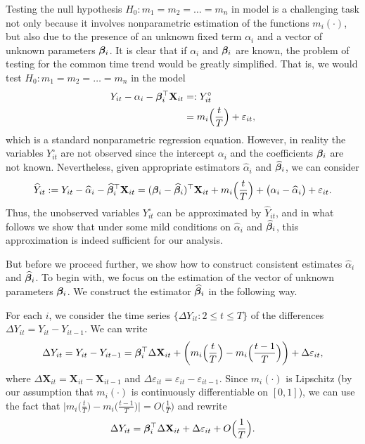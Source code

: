 \documentclass[a4paper,12pt]{article}
\makeatletter
\renewcommand{\eqref}[1]{\tagform@{\ref{#1}}}
\makeatother
\begin{document}
Testing the null hypothesis $H_0: m_1 = m_2 = \ldots = m_n$ in model \eqref{eq:model_full} is a challenging task not only because it involves nonparametric estimation of the functions $m_i(\cdot)$, but also due to the presence of an unknown fixed term $\alpha_i$ and a vector of unknown parameters $\bm{\beta}_i$. It is clear that if $\alpha_i$ and $\bm{\beta}_i$ are known, the problem of testing for the common time trend would be greatly simplified. That is, we would test $H_0: m_1 = m_2 = \ldots = m_n$ in the model
\begin{align*}
Y_{it} - \alpha_i - \bm{\beta}_i^\top \mathbf{X}_{it} & =: Y_{it}^\circ\\
					& = m_i \Big( \frac{t}{T} \Big) + \varepsilon_{it}, 
\end{align*}
which is a standard nonparametric regression equation. However, in reality the variables $Y_{it}^\circ$ are not observed since the intercept $\alpha_i$ and the coefficients $\bm{\beta}_i$ are not known. Nevertheless, given appropriate estimators $\widehat{\alpha}_i$ and $\widehat{\bm{\beta}}_i$, we can consider
\begin{align*}
	\widehat{Y}_{it} := Y_{it} -\widehat{\alpha}_i - \widehat{\bm{\beta}}_i^\top \mathbf{X}_{it} =(\bm{\beta}_i - \widehat{\bm{\beta}}_i)^\top \mathbf{X}_{it} + m_i \Big( \frac{t}{T} \Big) + \big( \alpha_i - \widehat{\alpha}_i \big) + \varepsilon_{it}. 
\end{align*}
Thus, the unobserved variables $Y_{it}^\circ$ can be approximated by $\widehat{Y}_{it}$, and in what follows we show that under some mild conditions on $\widehat{\alpha}_i$ and $\widehat{\bm{\beta}}_i$, this approximation is indeed sufficient for our analysis. 

But before we proceed further, we show how to construct consistent estimates $\widehat{\alpha}_i$ and $\widehat{\bm{\beta}}_i$. To begin with, we focus on the estimation of the vector of unknown parameters $\bm{\beta}_i$. We construct the estimator  $\widehat{\bm{\beta}}_i$ in the following way.

For each $i$, we consider the time series $\{\Delta Y_{it}: 2 \leq t \leq T\}$ of the differences \linebreak $\Delta Y_{it} = Y_{it} - Y_{i t-1}$. We can write
\begin{align*}
	\Delta Y_{it} = Y_{it} - Y_{i t-1} =\bm{\beta}_i^\top \Delta \mathbf{X}_{it} + \bigg(m_i \Big( \frac{t}{T} \Big) - m_i \Big(\frac{t-1}{T}\Big)\bigg) + \Delta \varepsilon_{it},
\end{align*}
where $\Delta  \mathbf{X}_{it} =  \mathbf{X}_{it} -  \mathbf{X}_{it-1}$ and $ \Delta \varepsilon_{it} = \varepsilon_{it} - \varepsilon_{i t-1}$. Since $m_i(\cdot)$ is Lipschitz (by our assumption that $m_i(\cdot)$ is continuously differentiable on $[0, 1]$), we can use the fact that $ \big|m_i \big( \frac{t}{T} \big) - m_i \big(\frac{t-1}{T}\big) \big| = O\big(\frac{1}{T}\big)$ and rewrite 
\begin{align}\label{model_with_regs}
	\Delta Y_{it} = \bm{\beta}_i^\top \Delta \mathbf{X}_{it} + \Delta \varepsilon_{it} + O\Big(\frac{1}{T}\Big).
\end{align}
\end{document}
